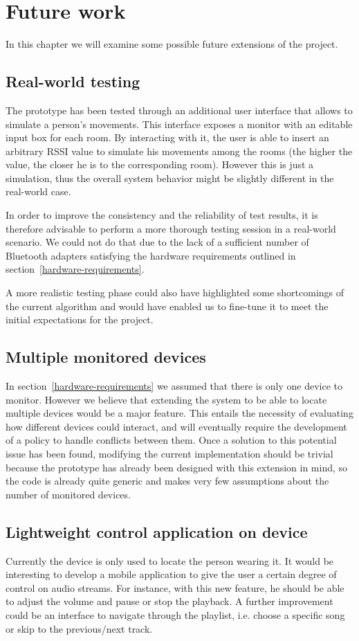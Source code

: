 \documentclass[conference]{IEEEtran}
\begin{document}
\section{Future work}
In this chapter we will examine some possible future extensions of the project.

\subsection{Real-world testing}
The prototype has been tested through an additional user interface that allows to simulate a person's movements. This interface exposes a monitor with an editable input box for each room. By interacting with it, the user is able to insert an arbitrary RSSI value to simulate his movements among the rooms (the higher the value, the closer he is to the corresponding room). However this is just a simulation, thus the overall system behavior might be slightly different in the real-world case.

In order to improve the consistency and the reliability of test results, it is therefore advisable to perform a more thorough testing session in a real-world scenario. We could not do that due to the lack of a sufficient number of Bluetooth adapters satisfying the hardware requirements outlined in section~\ref{hardware-requirements}.

A more realistic testing phase could also have highlighted some shortcomings of the current algorithm and would have enabled us to fine-tune it to meet the initial expectations for the project.

\subsection{Multiple monitored devices}
In section~\ref{hardware-requirements} we assumed that there is only one device to monitor. However we believe that extending the system to be able to locate multiple devices would be a major feature. This entails the necessity of evaluating how different devices could interact, and will eventually require the development of a policy to handle conflicts between them. Once a solution to this potential issue has been found, modifying the current implementation should be trivial because the prototype has already been designed with this extension in mind, so the code is already quite generic and makes very few assumptions about the number of monitored devices.

\subsection{Lightweight control application on device}
Currently the device is only used to locate the person wearing it. It would be interesting to develop a mobile application to give the user a certain degree of control on audio streams. For instance, with this new feature, he should be able to adjust the volume and pause or stop the playback. A further improvement could be an interface to navigate through the playlist, i.e. choose a specific song or skip to the previous/next track.
\end{document}
